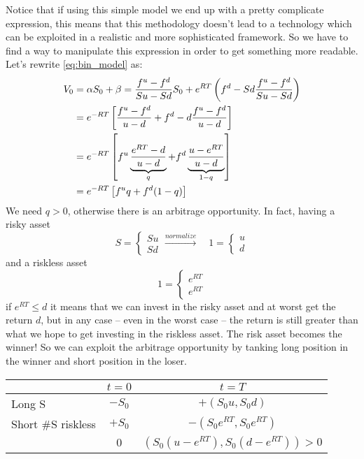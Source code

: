 Notice that if using this simple model we end up with a pretty complicate expression, this means that this methodology doesn't lead to a technology which can be exploited in a realistic and more sophisticated framework. So we have to find a way to manipulate this expression in order to get something more readable.\\
Let's rewrite \eqref{eq:bin_model} as:
\begin{align}\label{readable}
    \notag V_0 
    &= 
    \alpha S_0 + \beta = \dfrac{f^u-f^d}{Su-Sd}S_0 + e^{RT}\left(f^d-Sd\dfrac{f^u-f^d}{Su-Sd}\right) \\
    \notag &=
    e^{-RT}\left[\dfrac{f^u-f^d}{u-d}+f^d-d\dfrac{f^u-f^d}{u-d}\right] \\
    \notag &=
    e^{-RT}\left[f^u\underbrace{\dfrac{e^{RT}-d}{u-d}}_{q}+f^d\underbrace{\dfrac{u-e^{RT}}{u-d}}_{1-q}\right] \\
    &=
    e^{-RT}\left[f^u q + f^d(1-q)\right]
\end{align}
We need $q>0$, otherwise there is an arbitrage opportunity. In fact, having a risky asset
\begin{equation*}
    S = \begin{cases}
        Su \\ Sd
    \end{cases} \overset{normalize}{\longrightarrow} \quad
    1 = \begin{cases}
        u \\ d
    \end{cases}
\end{equation*}
and a riskless asset
\begin{equation*}
    1 = \begin{cases}
        e^{RT} \\ e^{RT}
    \end{cases}
\end{equation*}
if $e^{RT}\le d$ it means that we can invest in the risky asset and at worst get the return $d$, but in any case -- even in the worst case -- the return is still greater than what we hope to get investing in the riskless asset. The risk asset becomes the winner! So we can exploit the arbitrage opportunity by tanking long position in the winner and short position in the loser.
\begin{center}
    \begin{tabular}{lcc} 
        \toprule
                            & $t=0$   & $t=T$                    \\\midrule
        Long S              & $-S_0$  & $+(S_0u,S_0d)$           \\
        Short \#S riskless   & $+S_0$  & $-(S_0e^{RT},S_0e^{RT})$ \\
                                                                 \midrule\midrule
                            & $0$     & $(S_0(u-e^{RT}),S_0(d-e^{RT}))>0$       \\\bottomrule
    \end{tabular}
\end{center}
